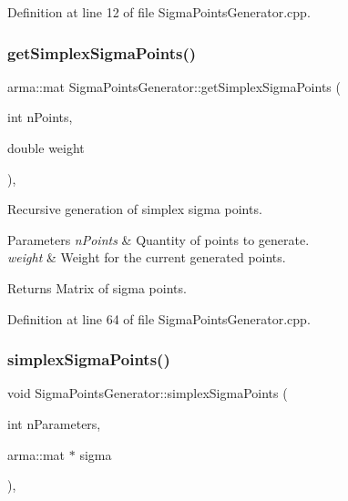 Definition at line 12 of file Sigma\+Points\+Generator.\+cpp.

\mbox{\label{classSigmaPointsGenerator_a5cfc30f689336a2a736e8c02fdaccfd2}} 
\subsubsection{\texorpdfstring{get\+Simplex\+Sigma\+Points()}{getSimplexSigmaPoints()}}
{\footnotesize\ttfamily arma\+::mat Sigma\+Points\+Generator\+::get\+Simplex\+Sigma\+Points (\begin{DoxyParamCaption}\item[{int}]{n\+Points,  }\item[{double}]{weight }\end{DoxyParamCaption})\hspace{0.3cm}{\ttfamily [static]}, {\ttfamily [private]}}

Recursive generation of simplex sigma points. 
\begin{DoxyParams}{Parameters}
{\em n\+Points} & Quantity of points to generate. \\
\hline
{\em weight} & Weight for the current generated points. \\
\hline
\end{DoxyParams}
\begin{DoxyReturn}{Returns}
Matrix of sigma points. 
\end{DoxyReturn}


Definition at line 64 of file Sigma\+Points\+Generator.\+cpp.

\mbox{\label{classSigmaPointsGenerator_a565e88c8abc4d82fc4c6aed75f9693a9}} 
\subsubsection{\texorpdfstring{simplex\+Sigma\+Points()}{simplexSigmaPoints()}}
{\footnotesize\ttfamily void Sigma\+Points\+Generator\+::simplex\+Sigma\+Points (\begin{DoxyParamCaption}\item[{int}]{n\+Parameters,  }\item[{arma\+::mat $\ast$}]{sigma }\end{DoxyParamCaption})\hspace{0.3cm}{\ttfamily [static]}, {\ttfamily [protected]}}

